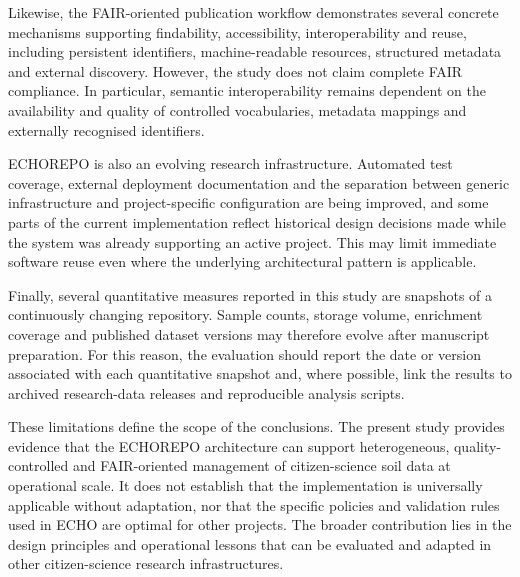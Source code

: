Likewise, the FAIR-oriented publication workflow demonstrates several concrete mechanisms supporting findability, accessibility, interoperability and reuse, including persistent identifiers, machine-readable resources, structured metadata and external discovery. However, the study does not claim complete FAIR compliance. In particular, semantic interoperability remains dependent on the availability and quality of controlled vocabularies, metadata mappings and externally recognised identifiers.

ECHOREPO is also an evolving research infrastructure. Automated test coverage, external deployment documentation and the
separation between generic infrastructure and project-specific
configuration are being improved, and some parts of the current implementation reflect historical design decisions made while the system was already supporting an active project. This may limit immediate software reuse even where the underlying architectural pattern is applicable.

Finally, several quantitative measures reported in this study are snapshots of a continuously changing repository. Sample counts, storage volume, enrichment coverage and published dataset versions may therefore evolve after manuscript preparation. For this reason, the evaluation should report the date or version associated with each quantitative snapshot and, where possible, link the results to archived research-data releases and reproducible analysis scripts.

These limitations define the scope of the conclusions. The present study provides evidence that the ECHOREPO architecture can support heterogeneous, quality-controlled and FAIR-oriented management of citizen-science soil data at operational scale. It does not establish that the implementation is universally applicable without adaptation, nor that the specific policies and validation rules used in ECHO are optimal for other projects. The broader contribution lies in the design principles and operational lessons that can be evaluated and adapted in other citizen-science research infrastructures.